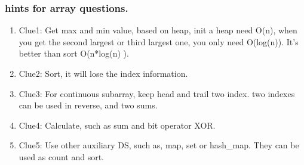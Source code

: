 \documentclass[a4paper,11pt,twoside]{book}
\begin{document}
\subsubsection{hints for array questions.}

\begin{enumerate}
	\item Clue1: Get max and min value, based on heap, init a heap need O(n), when you get the second largest or third largest one, you only need O(log(n)). It's better than sort O(n*log(n) ). 
	
	\item Clue2: Sort, it will lose the index information. 
	
	\item Clue3: For continuous subarray, keep head and trail two index. two indexes can be used in reverse, and two sums. 
	
	\item Clue4: Calculate, such as sum and bit operator XOR. 
	
	\item Clue5: Use other auxiliary DS, such as, map, set or hash\_map.  They can be used as count and sort. 
\end{enumerate}
\end{document}

